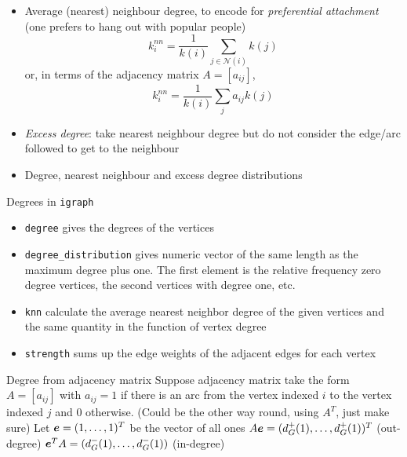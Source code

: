 \documentclass[aspectratio=169]{beamer}\usepackage[]{graphicx}\usepackage[]{xcolor}
\begin{document}
\begin{frame}
	\begin{itemize}
		\item Average (nearest) neighbour degree, to encode for \emph{preferential attachment} (one prefers to hang out with popular people)
		\[
			k_i^{nn} = \frac{1}{k(i)}\sum_{j\in\mathcal{N}(i)}k(j)
		\]
		or, in terms of the adjacency matrix $A=[a_{ij}]$,
		\[
			k_i^{nn} = \frac{1}{k(i)}\sum_{j}a_{ij}k(j)
		\]
		\item \emph{Excess degree}: take nearest neighbour degree but do not consider the edge/arc followed to get to the neighbour
		\item Degree, nearest neighbour and excess degree distributions
	\end{itemize}
\end{frame}


\begin{frame}{Degrees in {\tt igraph}}
	\begin{itemize}
		\item {\tt degree} gives the degrees of the vertices
		\item {\tt degree\_distribution} gives numeric vector of the same length as the maximum degree plus one. The first element is the relative frequency zero degree vertices, the second vertices with degree one, etc.
		\item {\tt knn} calculate the average nearest neighbor degree of the given vertices and the same quantity in the function of vertex degree
		\item {\tt strength} sums up the edge weights of the adjacent edges for each vertex
	\end{itemize}
\end{frame}

\begin{frame}{Degree from adjacency matrix}
	Suppose adjacency matrix take the form $A=[a_{ij}]$ with $a_{ij}=1$ if there is an arc from the vertex indexed $i$ to the vertex indexed $j$ and 0 otherwise. (Could be the other way round, using $A^T$, just make sure)
	\vfill
	Let $\bm{e}=(1,\ldots,1)^T$ be the vector of all ones 
	\vfill
	$A\bm{e}=(d_G^+(1),\ldots,d_G^+(1))^T$ (out-degree)
	\vfill
	$\bm{e}^TA=(d_G^-(1),\ldots,d_G^-(1))$ (in-degree)
\end{frame}



\end{document}
